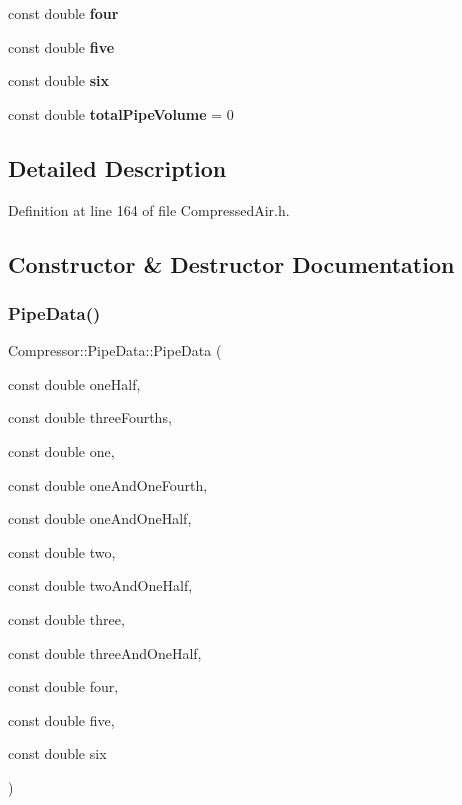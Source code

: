 \begin{DoxyCompactItemize}
const double {\bfseries four}
\item 
\mbox{\label{struct_compressor_1_1_pipe_data_aa4ca33456ade4559b80bdc55d785ca12}} 
const double {\bfseries five}
\item 
\mbox{\label{struct_compressor_1_1_pipe_data_acabd73fa371dec551937b5d9f7718317}} 
const double {\bfseries six}
\item 
\mbox{\label{struct_compressor_1_1_pipe_data_aa290d5d7f31c6b74f65b22d81b4ebf84}} 
const double {\bfseries total\+Pipe\+Volume} = 0
\end{DoxyCompactItemize}


\subsection{Detailed Description}


Definition at line 164 of file Compressed\+Air.\+h.



\subsection{Constructor \& Destructor Documentation}
\mbox{\label{struct_compressor_1_1_pipe_data_a71acdc81e25bd90b51361bf8d4f0ed38}} 
\subsubsection{\texorpdfstring{Pipe\+Data()}{PipeData()}\hspace{0.1cm}{\footnotesize\ttfamily [1/6]}}
{\footnotesize\ttfamily Compressor\+::\+Pipe\+Data\+::\+Pipe\+Data (\begin{DoxyParamCaption}\item[{const double}]{one\+Half,  }\item[{const double}]{three\+Fourths,  }\item[{const double}]{one,  }\item[{const double}]{one\+And\+One\+Fourth,  }\item[{const double}]{one\+And\+One\+Half,  }\item[{const double}]{two,  }\item[{const double}]{two\+And\+One\+Half,  }\item[{const double}]{three,  }\item[{const double}]{three\+And\+One\+Half,  }\item[{const double}]{four,  }\item[{const double}]{five,  }\item[{const double}]{six }\end{DoxyParamCaption})\hspace{0.3cm}{\ttfamily [inline]}}

